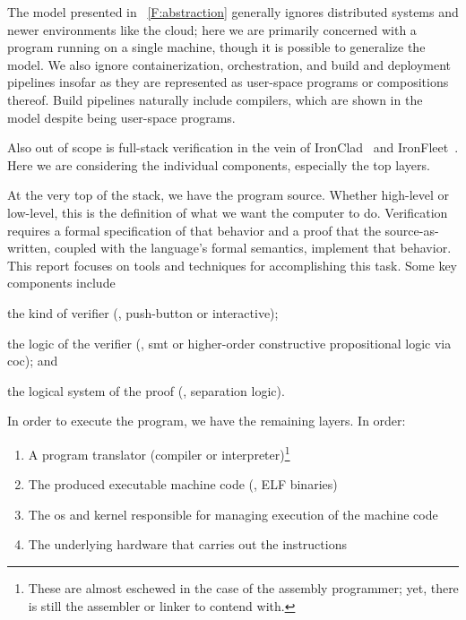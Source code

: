 The model presented in \figurename~\ref{F:abstraction} generally ignores
distributed systems and newer environments like the cloud; here we are primarily
concerned with a program running on a single machine, though it is possible to
generalize the model. We also ignore containerization, orchestration, and build
and deployment pipelines insofar as they are represented as user-space programs
or compositions thereof. Build pipelines naturally include compilers, which are
shown in the model despite being user-space programs.

Also out of scope is full-stack verification in the vein of
IronClad~\cite{hawblitzel2014ironclad} and
IronFleet~\cite{hawblitzel2015ironfleet}. Here we are considering the individual
components, especially the top layers.

At the very top of the stack, we have the program source. Whether high-level or
low-level, this is the definition of what we want the computer to do.
Verification requires a formal specification of that behavior and a proof that
the source-as-written, coupled with the language's formal semantics, implement
that behavior. This report focuses on tools and techniques for accomplishing
this task. Some key components include
\begin{inlist}
\item the kind of verifier (\eg, push-button or interactive);
\item the logic of the verifier (\eg, \gls{smt} or higher-order constructive
    propositional logic via \gls{coc}); and
\item the logical system of the proof (\eg, separation logic).
\end{inlist}

In order to execute the program, we have the remaining layers. In order:
\begin{enumerate}
    \item\label{i:stack_translator} A program translator (compiler or
        interpreter)\footnote{These are almost eschewed in the case of the
        assembly programmer; yet, there is still the assembler or linker to
        contend with.}
    \item\label{i:stack_asm} The produced executable machine code (\eg, ELF
        binaries)
    \item\label{i:stack_OS} The \gls{os} and kernel responsible for managing execution
        of the machine code
    \item\label{i:stack_hardware} The underlying hardware that carries out the
        instructions
\end{enumerate}

